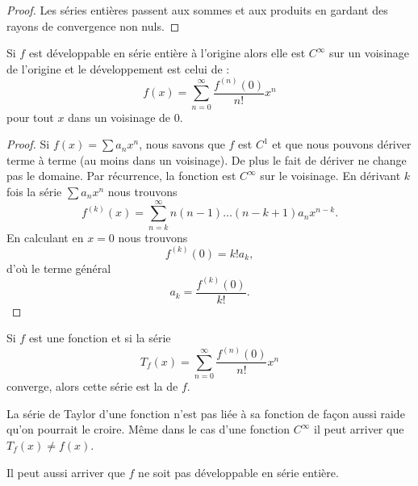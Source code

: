 \begin{proof}
	Les séries entières passent aux sommes et aux produits en gardant des rayons de convergence non nuls.
\end{proof}

\begin{proposition} \label{ThoTGPtDj}
	Si \( f\) est développable en série entière à l'origine alors elle est \( C^{\infty}\) sur un voisinage de l'origine et le développement est celui de  :
	\begin{equation}
		f(x)=\sum_{n=0}^{\infty}\frac{ f^{(n)}(0) }{ n! }x^n
	\end{equation}
	pour tout \( x\) dans un voisinage de \( 0\).
\end{proposition}

\begin{proof}
	Si \( f(x)=\sum a_nx^n\), nous savons que \( f\) est \( C^1\) et que nous pouvons dériver terme à terme (au moins dans un voisinage). De plus le fait de dériver ne change pas le domaine. Par récurrence, la fonction est \( C^{\infty}\) sur le voisinage. En dérivant \( k\) fois la série \( \sum a_nx^n\) nous trouvons
	\begin{equation}
		f^{(k)}(x)=\sum_{n=k}^{\infty}n(n-1)\ldots (n-k+1)a_nx^{n-k}.
	\end{equation}
	En calculant en \( x=0\) nous trouvons
	\begin{equation}
		f^{(k)}(0)=k! a_k,
	\end{equation}
	d'où le terme général
	\begin{equation}
		a_k=\frac{ f^{(k)}(0) }{ k! }.
	\end{equation}
\end{proof}

Si \( f\) est une fonction et si la série
\begin{equation}
	T_f(x)=\sum_{n=0}^{\infty}\frac{ f^{(n)}(0) }{ n! }x^n
\end{equation}
converge, alors cette série est la  de \( f\).

\begin{remark}
	La série de Taylor d'une fonction n'est pas liée à sa fonction de façon aussi raide qu'on pourrait le croire. Même dans le cas d'une fonction \( C^{\infty}\) il peut arriver que \( T_f(x)\neq f(x)\).

	Il peut aussi arriver que \( f\) ne soit pas développable en série entière.
\end{remark}

